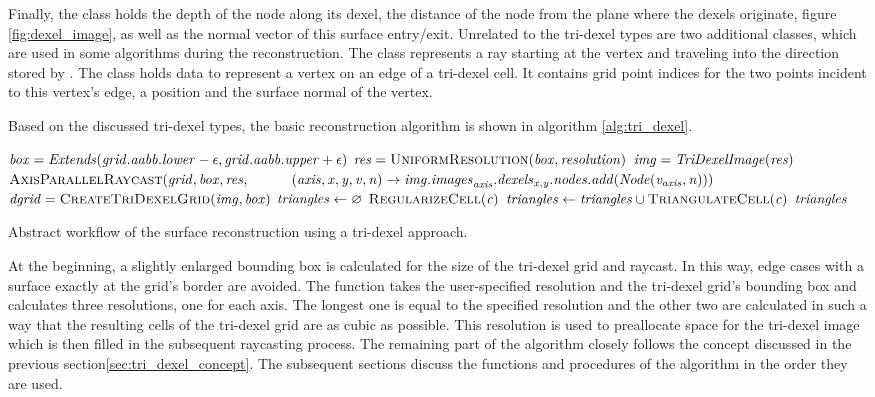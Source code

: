 Finally, the  class holds the depth of the node along its dexel, \ie the distance of the node from the plane where the dexels originate, \cf figure \ref{fig:dexel_image}, as well as the normal vector of this surface entry/exit.
Unrelated to the tri-dexel types are two additional classes, which are used in some algorithms during the reconstruction.
The  class represents a ray starting at the vertex  and traveling into the direction stored by .
The  class holds data to represent a vertex on an edge of a tri-dexel cell.
It contains grid point indices for the two points incident to this vertex's edge, a position and the surface normal of the vertex.

Based on the discussed tri-dexel types, the basic reconstruction algorithm is shown in algorithm \ref{alg:tri_dexel}.
%
\begin{algorithm}
	\centering
	\begin{algorithmic}[1]
			\State $\mathit{box} = \mathit{Extends}(\mathit{grid}.\mathit{aabb}.\mathit{lower} - \epsilon, \mathit{grid}.\mathit{aabb}.\mathit{upper} + \epsilon)$
			\State $\var{res} = \Call{UniformResolution}{\var{box}, \var{resolution}}$
			\State $\mathit{img} = \mathit{TriDexelImage}(\mathit{res})$
			\State $\Call{AxisParallelRaycast}{\var{grid}, \var{box}, \var{res},\hfill\break
				\hspace*{\dimexpr\algorithmicindent*2}(\var{axis}, \var{x}, \var{y}, \var{v}, \var{n}) \rightarrow \var{img}.\var{images}_{\var{axis}}.\var{dexels}_{\var{x}, \var{y}}.\var{nodes}.\var{add}(\var{Node}(\var{v}_{\var{axis}}, \var{n}))}$
			\State $\var{dgrid} = \Call{CreateTriDexelGrid}{\var{img}, \var{box}}$
			\State $\mathit{triangles} \gets \varnothing$
				\State $\Call{RegularizeCell}{\var{c}}$
				\State $\var{triangles} \gets \var{triangles} \cup \Call{TriangulateCell}{\var{c}}$
			\EndFor
			\State \Return $\mathit{triangles}$
		\EndFunction
	\end{algorithmic}
	\caption{
		Abstract workflow of the surface reconstruction using a tri-dexel approach.
	}
	\label{alg:tri_dexel}
\end{algorithm}
%
At the beginning, a slightly enlarged bounding box is calculated for the size of the tri-dexel grid and raycast.
In this way, edge cases with a surface exactly at the grid's border are avoided.
The  function takes the user-specified resolution and the tri-dexel grid's bounding box and calculates three resolutions, one for each axis.
The longest one is equal to the specified resolution and the other two are calculated in such a way that the resulting cells of the tri-dexel grid are as cubic as possible.
This resolution is used to preallocate space for the tri-dexel image which is then filled in the subsequent raycasting process.
The remaining part of the algorithm closely follows the concept discussed in the previous section\ref{sec:tri_dexel_concept}.
The subsequent sections discuss the functions and procedures of the algorithm in the order they are used.


